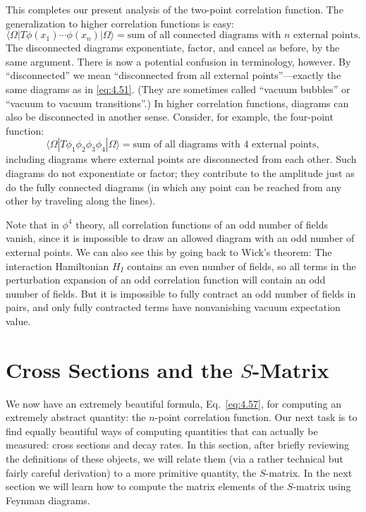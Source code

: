 This completes our present analysis of the two-point correlation function.
The generalization to higher correlation functions is easy:
\begin{equation}
  \langle\Omega|T\phi(x_1)\cdots\phi(x_n)|\Omega\rangle
  = \text{sum of all connected diagrams with } n \text{ external points} .
  \label{eq:4.57}
\end{equation}
The disconnected diagrams exponentiate, factor, and cancel as before, by the
same argument.  There is now a potential confusion in terminology, however.
By ``disconnected'' we mean ``disconnected from all external points''---exactly
the same diagrams as in \eqref{eq:4.51}.  (They are sometimes called
``vacuum bubbles'' or ``vacuum to vacuum transitions''.)  In higher
correlation functions, diagrams can also be disconnected in another sense.
Consider, for example, the four-point function:
\begin{equation}
  \langle\Omega|T\phi_1\phi_2\phi_3\phi_4|\Omega\rangle
  = \text{sum of all diagrams with 4 external points},
  \label{eq:4.58}
\end{equation}
including diagrams where external points are disconnected from each other.
Such diagrams do not exponentiate or factor; they contribute to the amplitude
just as do the fully connected diagrams (in which any point can be reached
from any other by traveling along the lines).

Note that in $\phi^4$ theory, all correlation functions of an odd number of
fields vanish, since it is impossible to draw an allowed diagram with an odd
number of external points.  We can also see this by going back to Wick's
theorem: The interaction Hamiltonian $H_I$ contains an even number of fields,
so all terms in the perturbation expansion of an odd correlation function
will contain an odd number of fields.  But it is impossible to fully contract
an odd number of fields in pairs, and only fully contracted terms have
nonvanishing vacuum expectation value.

\section{Cross Sections and the $S$-Matrix}

We now have an extremely beautiful formula, Eq.~\eqref{eq:4.57}, for
computing an extremely abstract quantity: the $n$-point correlation function.
Our next task is to find equally beautiful ways of computing quantities that
can actually be measured: cross sections and decay rates.  In this section,
after briefly reviewing the definitions of these objects, we will relate them
(via a rather technical but fairly careful derivation) to a more primitive
quantity, the $S$-matrix.  In the next section we will learn how to compute
the matrix elements of the $S$-matrix using Feynman diagrams.


